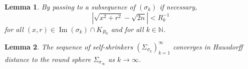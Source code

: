 \documentclass[10pt,a4paper]{amsart}
\newtheorem{lem}{Lemma}
\begin{document}
		\begin{lem} \label{sigma^c_k stays close to sigma_infty}
			By passing to a subsequence of $(\sigma_k)$ if necessary,  
			\begin{equation} \label{eqn sigma^C_k closed to sigma_infty}
				|\sqrt{x^2+r^2} - \sqrt{2n}|<R_k^{-1}
			\end{equation}
			for all $(x, r)\in \operatorname{Im} (\sigma_k) \cap K_{R_k}$ and for all $k\in \mathbb N$.
		\end{lem}

		\begin{lem} \label{claim 3} 
			The sequence of self-shrinkers $(\Sigma_{\sigma_k})_{k=1}^\infty$ converges in Hausdorff distance to the round sphere $\Sigma_{\sigma_\infty}$ as $k\to \infty$. 
		\end{lem}
\end{document}
